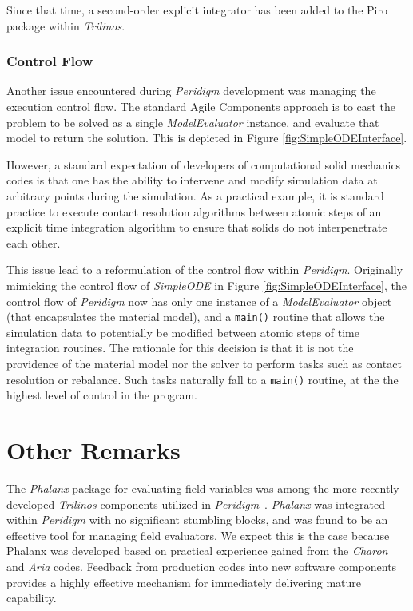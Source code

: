 \documentclass[pdf,ps2pdf,12pt,report]{SANDreport}
\theoremstyle{plain}
\theoremstyle{definition}
\theoremstyle{remark}
\numberwithin{equation}{section}
\begin{document}
Since that time, a second-order explicit integrator has been added to the Piro package within \emph{Trilinos}.

\subsubsection{Control Flow}

Another issue encountered during \emph{Peridigm} development was managing the execution control flow. The standard Agile Components approach is to cast the problem to be solved as a single \emph{ModelEvaluator} instance, and evaluate that model to return the solution. This is depicted in Figure \ref{fig:SimpleODEInterface}.

However, a standard expectation of developers of computational solid mechanics codes is that one has the ability to intervene and modify simulation data at arbitrary points during the simulation. As a practical example, it is standard practice to execute contact resolution algorithms between atomic steps of an explicit time integration algorithm to ensure that solids do not interpenetrate each other.

This issue lead to a reformulation of the control flow within \emph{Peridigm}. Originally mimicking the control flow of \emph{SimpleODE} in Figure \ref{fig:SimpleODEInterface}, the control flow of \emph{Peridigm} now has only one instance of a \emph{ModelEvaluator} object (that encapsulates the material model), and a \texttt{main()} routine that allows the simulation data to potentially be modified between atomic steps of time integration routines. The rationale for this decision is that it is not the providence of the material model nor the solver to perform tasks such as contact resolution or rebalance. Such tasks naturally fall to a \texttt{main()} routine, at the the highest level of control in the program.

\section{Other Remarks}

The \emph{Phalanx} package for evaluating field variables was among the more recently developed \emph{Trilinos} components utilized in \emph{Peridigm}~\cite{PhalanxWebPage:2011}.  \emph{Phalanx} was integrated within \emph{Peridigm} with no significant stumbling blocks, and was found to be an effective tool for managing field evaluators.  We expect this is the case because Phalanx was developed based on practical experience gained from the \emph{Charon} and \emph{Aria} codes. Feedback from production codes into new software components provides a highly effective mechanism for immediately delivering mature capability.
\end{document}
